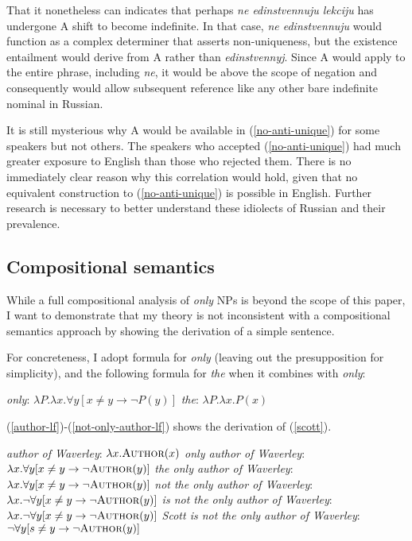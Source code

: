 That it nonetheless can indicates that perhaps \textit{ne edinstvennuju lekciju} has undergone  \textsc{A} shift to become indefinite. In that case, \textit{ne edinstvennuju} would function as a complex determiner that asserts non-uniqueness, but the existence entailment would derive from \textsc{A} rather than \textit{edinstvennyj}. Since \textsc{A} would apply to the entire phrase, including \textit{ne}, it would be above the scope of negation and consequently would allow subsequent reference like any other bare indefinite nominal in Russian.

It is still mysterious why \textsc{A} would be available in (\ref{no-anti-unique}) for some speakers but not others. The speakers who accepted (\ref{no-anti-unique}) had much greater exposure to English than those who rejected them. There is no immediately clear reason why this correlation would hold, given that no equivalent construction to (\ref{no-anti-unique}) is possible in English. Further research is necessary to better understand these idiolects of Russian and their prevalence.

\subsection{Compositional semantics}
While a full compositional analysis of \textit{only} NPs is beyond the scope of this paper, I want to demonstrate that my theory is not inconsistent with a compositional semantics approach by showing the derivation of a simple sentence.

For concreteness, I adopt  formula for \textit{only} (leaving out the presupposition for simplicity), and the following formula for \textit{the} when it combines with \textit{only}:

\begin{exe}
	\ex \textit{only}: $ \lambda P . \lambda x . \forall y [ x \ne y \to \neg P(y) ] $
	\ex \textit{the}: $\lambda P . \lambda x . P(x)$
\end{exe}

(\ref{author-lf})-(\ref{not-only-author-lf}) shows the derivation of (\ref{scott}).

\begin{exe}
	\ex \label{author-lf} \textit{author of Waverley}: $\lambda x . \textsc{Author}(x)$
	\ex \textit{only author of Waverley}: $\lambda x . \forall y [ x \ne y \to \neg \textsc{Author}(y) ]$
	\ex \textit{the only author of Waverley}: $\lambda x . \forall y [ x \ne y \to \neg \textsc{Author}(y) ]$
	\ex \textit{not the only author of Waverley}: $\lambda x . \neg  \forall y [ x \ne y \to \neg \textsc{Author}(y) ]$
	\ex \textit{is not the only author of Waverley}: $\lambda x . \neg  \forall y [ x \ne y \to \neg \textsc{Author}(y) ]$
	\ex \label{not-only-author-lf} \textit{Scott is not the only author of Waverley}: $\neg \forall y [ s \ne y \to \neg \textsc{Author}(y) ]$
\end{exe}

